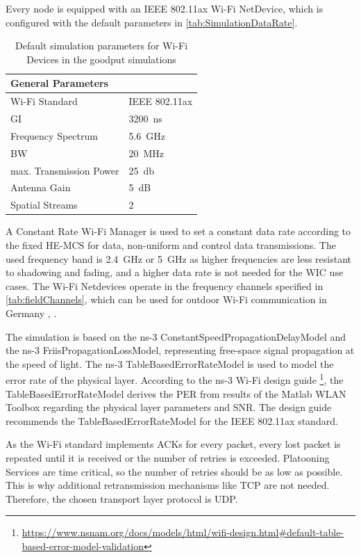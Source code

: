 Every node is equipped with an IEEE 802.11ax Wi-Fi NetDevice, which is configured with the default parameters in
\autoref{tab:SimulationDataRate}.
\begin{table}[H]
   \centering
   \begin{tabular}{p{6cm}p{4cm}}
      General Parameters & \\
      \midrule
      Wi-Fi Standard & IEEE 802.11ax\\
      \ac{GI} & \SI{3200}{\nano\second}\\
      Frequency Spectrum & \SI{5.6}{\giga\hertz}\\
      \ac{BW} & \SI{20}{\mega\hertz}\\
      max. Transmission Power & \SI{25}{\decibel}\\
      Antenna Gain & \SI{5}{\dB}\\
      Spatial Streams & 2\\
      \bottomrule
   \end{tabular}
   \caption{Default simulation parameters for Wi-Fi Devices in the goodput simulations}
   \label{tab:SimulationDataRate}
\end{table}

A Constant Rate Wi-Fi Manager is used to set a constant data rate according to the fixed \ac{HE}-\ac{MCS} for data, non-uniform and control data transmissions.
The used frequency band is \SI{2.4}{\giga\hertz} or \SI{5}{\giga\hertz} as higher frequencies are less resistant to shadowing and fading, and a higher data rate is not needed for the \ac{WIC} use cases.
The Wi-Fi Netdevices operate in the frequency channels specified in \autoref{tab:fieldChannels}, which can be used for
outdoor Wi-Fi communication in Germany \cite{freq_plan_24G}, \cite{freq_plan_5G}.

The simulation is based on the ns-3 ConstantSpeedPropagationDelayModel and the  ns-3 FriisPropagationLossModel,
representing free-space signal propagation at the speed of light.
The ns-3 TableBasedErrorRateModel is used to model the error rate of the physical layer.
According to the ns-3 Wi-Fi design guide \footnote{\url{https://www.nsnam.org/docs/models/html/wifi-design.html\#default-table-based-error-model-validation}},
the TableBasedErrorRateModel derives the \ac{PER} from results of the Matlab WLAN Toolbox
regarding the physical layer parameters and \ac{SNR}.
The design guide recommends the TableBasedErrorRateModel for the IEEE 802.11ax standard.

As the Wi-Fi standard implements ACKs for every packet, every lost packet is repeated until it is received or the number of retries is
exceeded.
Platooning Services are time critical, so the number of retries should be as low as possible.
This is why additional retransmission mechanisms like TCP are not needed.
Therefore, the chosen transport layer protocol is UDP.

